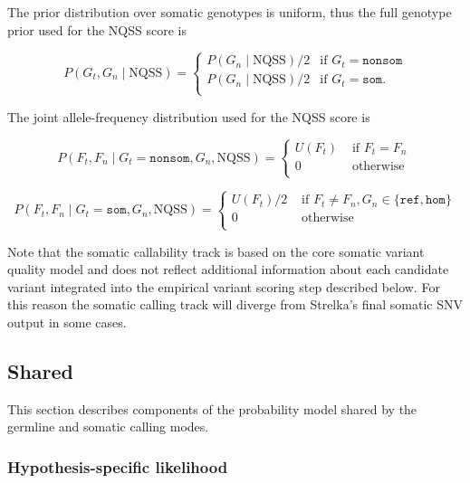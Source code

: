 \documentclass{article}
\begin{document}
The prior distribution over somatic genotypes is uniform, thus the full genotype prior used for the NQSS score is

\begin{equation*}
P(G_t, G_n \mid \text{NQSS}) =
\begin{cases}
P(G_n \mid \text{NQSS})/2 & \text{if } G_t = \texttt{nonsom} \\
P(G_n \mid \text{NQSS})/2 & \text{if } G_t = \texttt{som}. \\
\end{cases}
\end{equation*}


The joint allele-frequency distribution used for the NQSS score is

\begin{equation*}
P(F_t, F_n \mid G_t = \texttt{nonsom}, G_n, \text{NQSS})=
\begin{cases}
U(F_t) & \text{ if } F_t = F_n \\
0 & \text{ otherwise } \\
\end{cases}
\end{equation*}

\begin{equation*}
P(F_t, F_n \mid G_t = \texttt{som}, G_n, \text{NQSS})=
\begin{cases}
U(F_t)/2 & \text{ if } F_t \neq F_n, G_n \in \{\texttt{ref},\texttt{hom}\}  \\
0 & \text{ otherwise } \\
\end{cases}
\end{equation*}

Note that the somatic callability track is based on the core somatic variant quality model and does not reflect additional information about each candidate variant integrated into the empirical variant scoring step described below. For this reason the somatic calling track will diverge from Strelka's final somatic SNV output in some cases.

\subsection{Shared}
\label{sec:shared}
This section describes components of the probability model shared by the germline and somatic calling modes.

\subsubsection{Hypothesis-specific likelihood}
\label{sec:shared_lik}
\end{document}
